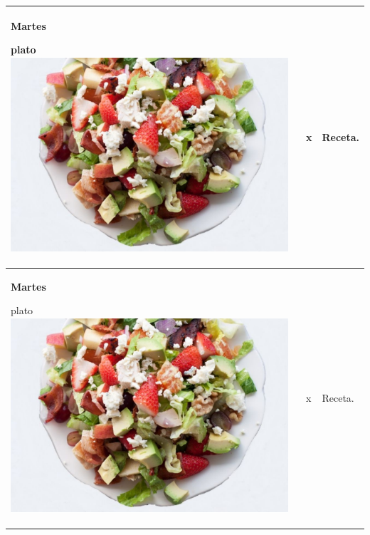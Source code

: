 \documentclass[menu.tex]{subfiles}
\begin{document}
\begin{tabular} {p{3.5cm} p{4cm} p{9cm}}
    \pbox{20cm}
    {
        \rule{0pt}{3ex}\begin{large}\textbf{Martes}\end{large}\\ 
        \rule{0pt}{2ex}plato\\
        \includegraphics[scale=0.30]{ensalada-vegetal-con-carne} 
    } & 
    \vspace{-1.75cm}            
    \begin{compactitem} 
        \begin{scriptsize}
            \item x
        \end{scriptsize}
    \end{compactitem}&
    \vspace{-1.7cm}
    Receta.\\
    
\hline

    \pbox{20cm}
    {
        \rule{0pt}{3ex}\begin{large}\textbf{Martes}\end{large}\\ 
        \rule{0pt}{2ex}plato\\
        \includegraphics[scale=0.30]{ensalada-vegetal-con-carne} 
    } & 
    \vspace{-1.75cm}            
    \begin{compactitem} 
        \begin{scriptsize}
            \item x
        \end{scriptsize}
    \end{compactitem}&
    \vspace{-1.7cm}
    Receta.\\
    \hline


\end{tabular}
\end{document}
